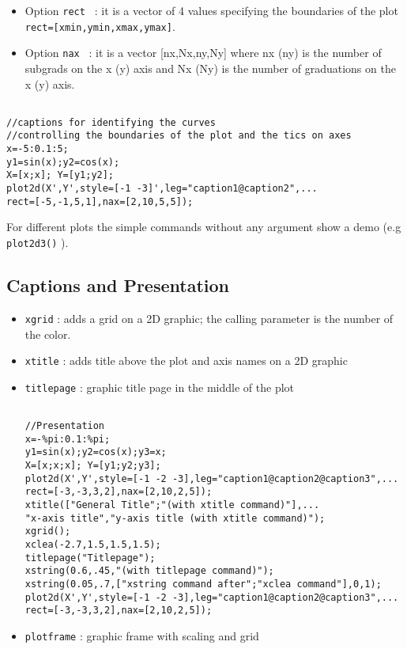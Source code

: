 \begin{itemize}
\item Option {\tt rect } 	: it is a vector of 4 values specifying the boundaries 
of the plot {\tt rect=[xmin,ymin,xmax,ymax]}.

\item Option {\tt nax }  	: it is a vector [nx,Nx,ny,Ny] where nx (ny) is 
the number of subgrads on the x (y) axis and Nx (Ny) is the number of 
graduations  on the x (y) axis.

\end{itemize}

\begin{verbatim}

//captions for identifying the curves
//controlling the boundaries of the plot and the tics on axes
x=-5:0.1:5;
y1=sin(x);y2=cos(x);
X=[x;x]; Y=[y1;y2];
plot2d(X',Y',style=[-1 -3]',leg="caption1@caption2",...
rect=[-5,-1,5,1],nax=[2,10,5,5]);

\end{verbatim}




For different plots the simple commands without any argument show a demo 
(e.g {\tt plot2d3()} ).

\subsection{Captions and Presentation}
%
\begin{itemize}
\item \verb+xgrid+	: adds a grid on a 2D graphic; the
calling parameter is the number of the color.
\item \verb+xtitle+	: adds	title above the plot and axis 
names on a 2D graphic
\item \verb+titlepage+	: graphic title page in the middle of
the plot

\begin{verbatim}

//Presentation
x=-%pi:0.1:%pi;
y1=sin(x);y2=cos(x);y3=x;
X=[x;x;x]; Y=[y1;y2;y3];
plot2d(X',Y',style=[-1 -2 -3],leg="caption1@caption2@caption3",...
rect=[-3,-3,3,2],nax=[2,10,2,5]);
xtitle(["General Title";"(with xtitle command)"],...
"x-axis title","y-axis title (with xtitle command)");
xgrid();
xclea(-2.7,1.5,1.5,1.5);
titlepage("Titlepage");
xstring(0.6,.45,"(with titlepage command)");
xstring(0.05,.7,["xstring command after";"xclea command"],0,1);
plot2d(X',Y',style=[-1 -2 -3],leg="caption1@caption2@caption3",...
rect=[-3,-3,3,2],nax=[2,10,2,5]);

\end{verbatim}




	\item \verb+plotframe+	: graphic frame with scaling and grid
\end{itemize}
%

